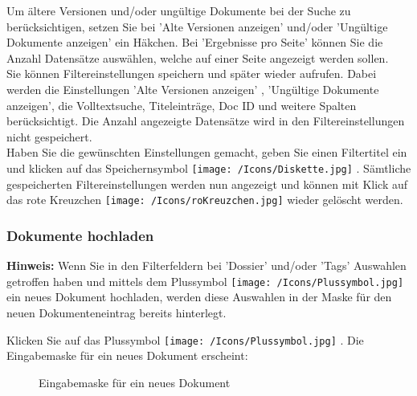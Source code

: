 Um ältere Versionen und/oder ungültige Dokumente bei der Suche zu berücksichtigen, setzen Sie bei 'Alte Versionen anzeigen'  und/oder 'Ungültige Dokumente anzeigen'  ein Häkchen. Bei 'Ergebnisse pro Seite'  können Sie die Anzahl Datensätze auswählen, welche auf einer Seite angezeigt werden sollen.\\
Sie können Filtereinstellungen speichern und später wieder aufrufen. Dabei werden die Einstellungen 'Alte Versionen anzeigen' , 'Ungültige Dokumente anzeigen', die Volltextsuche, Titeleinträge, Doc ID und weitere Spalten berücksichtigt. Die Anzahl angezeigte Datensätze wird in den Filtereinstellungen nicht gespeichert.\\
Haben Sie die gewünschten Einstellungen gemacht, geben Sie einen Filtertitel ein  und klicken auf das Speichernsymbol \texttt{[image: /Icons/Diskette.jpg]} . Sämtliche gespeicherten Filtereinstellungen werden nun angezeigt  und können mit Klick auf das rote Kreuzchen \texttt{[image: /Icons/roKreuzchen.jpg]}  wieder gelöscht werden.


\subsubsection{Dokumente hochladen}
\label{bkm:Ref442863508}\label{bkm:Ref442787515}\label{bkm:Ref442778397}\label{bkm:Ref442770648}\label{bkm:Ref442769978}

\textbf{Hinweis:} Wenn Sie in den Filterfeldern bei 'Dossier' und/oder 'Tags' Auswahlen getroffen haben und mittels dem Plussymbol \texttt{[image: /Icons/Plussymbol.jpg]}  ein neues Dokument hochladen, werden diese Auswahlen in der Maske für den neuen Dokumenteneintrag bereits hinterlegt.

\begin{figure}[H]
\end{figure}

Klicken Sie auf das Plussymbol \texttt{[image: /Icons/Plussymbol.jpg]} . Die Eingabemaske für ein neues Dokument erscheint:

\begin{figure}[H]
\caption{Eingabemaske für ein neues Dokument}
\end{figure}

